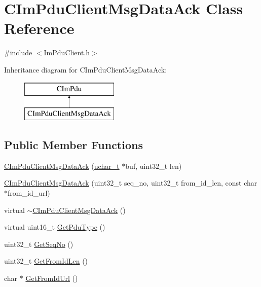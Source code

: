 \hypertarget{class_c_im_pdu_client_msg_data_ack}{}\section{C\+Im\+Pdu\+Client\+Msg\+Data\+Ack Class Reference}
\label{class_c_im_pdu_client_msg_data_ack}


{\ttfamily \#include $<$Im\+Pdu\+Client.\+h$>$}

Inheritance diagram for C\+Im\+Pdu\+Client\+Msg\+Data\+Ack\+:\begin{figure}[H]
\begin{center}
\leavevmode
\includegraphics[height=2.000000cm]{class_c_im_pdu_client_msg_data_ack}
\end{center}
\end{figure}
\subsection*{Public Member Functions}
\begin{DoxyCompactItemize}
\item 
\hyperlink{class_c_im_pdu_client_msg_data_ack_a5fefef9f2a2a35834ca1040ba537ac9f}{C\+Im\+Pdu\+Client\+Msg\+Data\+Ack} (\hyperlink{base_2ostype_8h_a124ea0f8f4a23a0a286b5582137f0b8d}{uchar\+\_\+t} $\ast$buf, uint32\+\_\+t len)
\item 
\hyperlink{class_c_im_pdu_client_msg_data_ack_a5600738aac8cfcba90750ed5058fbb75}{C\+Im\+Pdu\+Client\+Msg\+Data\+Ack} (uint32\+\_\+t seq\+\_\+no, uint32\+\_\+t from\+\_\+id\+\_\+len, const char $\ast$from\+\_\+id\+\_\+url)
\item 
virtual \hyperlink{class_c_im_pdu_client_msg_data_ack_a0d57e4f763315f83e4dc883912384533}{$\sim$\+C\+Im\+Pdu\+Client\+Msg\+Data\+Ack} ()
\item 
virtual uint16\+\_\+t \hyperlink{class_c_im_pdu_client_msg_data_ack_a72277edbd1a3c2d54fbddc5bd1683362}{Get\+Pdu\+Type} ()
\item 
uint32\+\_\+t \hyperlink{class_c_im_pdu_client_msg_data_ack_ab1e9054f86447b4dea2094ec24f4e48e}{Get\+Seq\+No} ()
\item 
uint32\+\_\+t \hyperlink{class_c_im_pdu_client_msg_data_ack_a980a77c83bf4470008c607b7cec03ae6}{Get\+From\+Id\+Len} ()
\item 
char $\ast$ \hyperlink{class_c_im_pdu_client_msg_data_ack_a1d20e345af793f57399e53f7eba7b5d9}{Get\+From\+Id\+Url} ()
\end{DoxyCompactItemize}
